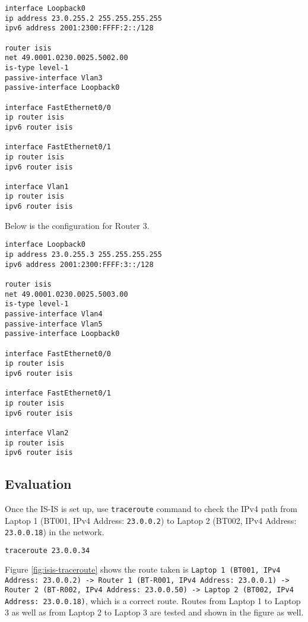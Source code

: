 \begin{lstlisting}
interface Loopback0
ip address 23.0.255.2 255.255.255.255
ipv6 address 2001:2300:FFFF:2::/128

router isis
net 49.0001.0230.0025.5002.00
is-type level-1
passive-interface Vlan3
passive-interface Loopback0

interface FastEthernet0/0
ip router isis
ipv6 router isis

interface FastEthernet0/1
ip router isis
ipv6 router isis

interface Vlan1
ip router isis
ipv6 router isis
\end{lstlisting}

Below is the configuration for Router 3.

\begin{lstlisting}
interface Loopback0
ip address 23.0.255.3 255.255.255.255
ipv6 address 2001:2300:FFFF:3::/128

router isis
net 49.0001.0230.0025.5003.00
is-type level-1
passive-interface Vlan4
passive-interface Vlan5
passive-interface Loopback0

interface FastEthernet0/0
ip router isis
ipv6 router isis

interface FastEthernet0/1
ip router isis
ipv6 router isis

interface Vlan2
ip router isis
ipv6 router isis
\end{lstlisting}


\subsection{Evaluation}

Once the IS-IS is set up, use \texttt{traceroute} command to check the IPv4 path from Laptop 1 (BT001, IPv4 Address: \texttt{23.0.0.2}) to Laptop 2 (BT002, IPv4 Address: \texttt{23.0.0.18}) in the network.

\begin{lstlisting}[language=sh]
traceroute 23.0.0.34
\end{lstlisting}

Figure \ref{fig:isis-traceroute} shows the route taken is 
\texttt{Laptop 1 (BT001, IPv4 Address: 23.0.0.2)
-> Router 1 (BT-R001, IPv4 Address: 23.0.0.1) 
-> Router 2 (BT-R002, IPv4 Address: 23.0.0.50)
-> Laptop 2 (BT002, IPv4 Address: 23.0.0.18)}, which is a correct route.
Routes from Laptop 1 to Laptop 3 as well as from Laptop 2 to Laptop 3 are tested and shown in the figure as well.

